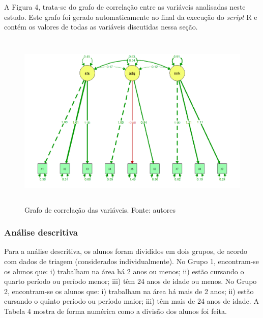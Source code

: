 A Figura 4, trata-se do grafo de correlação entre as variáveis analisadas neste estudo. Este grafo foi gerado automaticamente ao final da execução do \textit{script} R e contém os valores de todas as variáveis discutidas nessa seção.

\begin{figure}[!ht]
    \centering
    \includegraphics[width=15cm,height=8.5cm]{Imagens/RplotFinal.png}
    \caption{Grafo de correlação das variáveis. Fonte: autores}
    \label{fig:RplotFinal}
\end{figure}

\subsubsection{Análise descritiva}

Para a análise descritiva, os alunos foram divididos em dois grupos, de acordo com dados de triagem (considerados individualmente). No Grupo 1, encontram-se os alunos que: i) trabalham na área há 2 anos ou menos; ii) estão cursando o quarto período ou período menor; iii) têm 24 anos de idade ou menos. No Grupo 2, encontram-se os alunos que: i) trabalham na área há mais de 2 anos; ii) estão cursando o quinto período ou período maior; iii) têm mais de 24 anos de idade. A Tabela 4 mostra de forma numérica como a divisão dos alunos foi feita.

